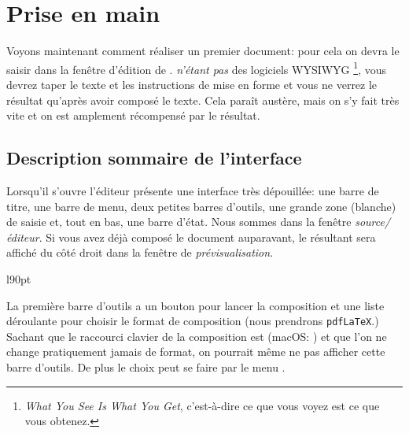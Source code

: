 
\chapter{Prise en main}
\label{chap:first-steps}

Voyons maintenant comment réaliser un premier document: pour cela on devra le saisir dans la fenêtre d'édition de \Tw{}. \AllTeX{} \emph{n'étant pas} des logiciels WYSIWYG \footnote{\emph{What You See Is What You Get}, c'est-à-dire \og ce que vous voyez est ce que vous obtenez\fg.}, vous devrez taper le texte et les instructions de mise en forme et vous ne verrez le résultat qu'après avoir \og composé\fg{} le texte. Cela paraît austère, mais on s'y fait très vite et on est amplement récompensé par le résultat.

\section{Description sommaire de l'interface}

\newsavebox{\inlineimg}

Lorsqu'il s'ouvre l'éditeur présente une interface très dépouillée: une barre de titre, une barre de menu, deux petites barres d'outils, une grande zone (blanche) de saisie et, tout en bas, une barre d'état. Nous sommes dans la fenêtre \emph{source/éditeur}. Si vous avez déjà composé le document auparavant, le  résultant sera affiché du côté droit dans la fenêtre de \emph{prévisualisation.}
\vspace{10pt}

\begin{wrapfigure}[2]{l}{90pt}
\vspace*{-1em}
\usebox{\inlineimg}
\end{wrapfigure}
\noindent La première barre d'outils a un bouton pour lancer la composition et une liste déroulante pour choisir le format de composition (nous prendrons \verb|pdfLaTeX|.) Sachant que le raccourci clavier de la composition est  (macOS: ) et que l'on ne change pratiquement jamais de format, on pourrait même ne pas afficher cette barre d'outils. De plus le choix peut se faire par le menu .
\vspace{10pt}

